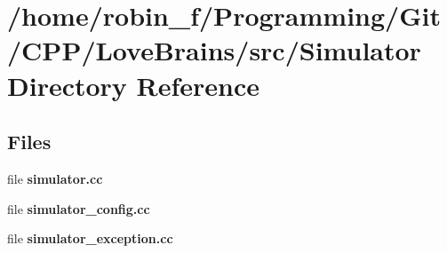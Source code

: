 \section{/home/robin\+\_\+f/\+Programming/\+Git/\+C\+P\+P/\+Love\+Brains/src/\+Simulator Directory Reference}
\label{dir_2205748093207516075771a340b5a719}
\subsection*{Files}
\begin{DoxyCompactItemize}
\item 
file {\bfseries simulator.\+cc}
\item 
file {\bfseries simulator\+\_\+config.\+cc}
\item 
file {\bfseries simulator\+\_\+exception.\+cc}
\end{DoxyCompactItemize}
